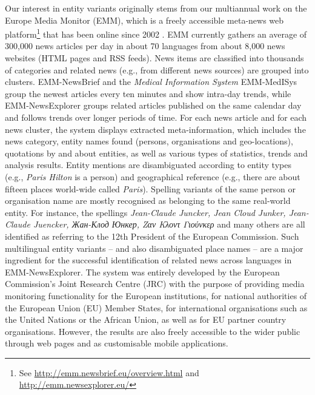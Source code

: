 \documentclass[output=paper]{langsci/langscibook}
\begin{document}
Our interest in entity variants originally stems from our multiannual work on the Europe Media Monitor (EMM), which is a freely accessible meta-news web platform\footnote{See \url{http://emm.newsbrief.eu/overview.html} and \url{http://emm.newsexplorer.eu/}} that has been online since 2002 \citep{steinberger-09,steinberger-15}. EMM currently gathers an average of 300,000 news articles per day in about 70 languages from about 8,000 news websites (HTML pages and RSS feeds). News items are classified into thousands of categories 
 and related news (e.g., from different news sources) are grouped into clusters. EMM-NewsBrief and the \textit{Medical Information System} EMM-MedISys group the newest articles every ten minutes and show intra-day trends, while EMM-NewsExplorer groups related articles published on the same calendar day and follows trends over longer periods of time. For each news article and for each news cluster, the system displays extracted meta-information, which includes the news category, entity names found (persons, organisations and geo-locations), quotations by and about entities, as well as various types of statistics, trends and analysis results. Entity mentions are disambiguated according to entity types (e.g., \textit{Paris Hilton} is a person) and geographical reference (e.g., there are about fifteen places world-wide called \textit{Paris}). Spelling variants of the same person or organisation name are mostly recognised as belonging to the same real-world entity. For instance, the spellings \textit{Jean-Claude Juncker, Jean Cloud Junker, Jean-Claude Juencker, Жан-Клод Юнкер, Ζαν Κλοντ Γιούνκερ} %
and many others are all identified as referring to the 12th President of the European Commission. Such multilingual entity variants – and also disambiguated place names – are a major ingredient for the successful identification of related news across languages in EMM-NewsExplorer. The system was entirely developed by the European Commission’s Joint Research Centre (JRC) with the purpose of providing media monitoring functionality for the European institutions, for national authorities of the European Union (EU) Member States, for international organisations such as the United Nations or the African Union, as well as for EU partner country organisations. However, the results are also freely accessible to the wider public through web pages and as customisable mobile applications.
\end{document}
